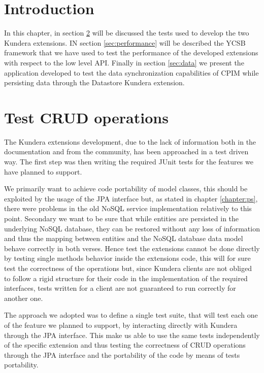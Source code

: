 \section{Introduction}
In this chapter, in section \ref{sec:crud} will be discussed the tests used to develop the two Kundera extensions.
IN section \ref{sec:performance} will be described the YCSB framework that we have used to test the performance of the developed extensions with respect to the low level API.
Finally in section \ref{sec:data} we present the application developed to test the data synchronization capabilities of CPIM while persisting data through the Datastore Kundera extension. 

\section{Test CRUD operations}
\label{sec:crud}
The Kundera extensions development, due to the lack of information both in the documentation and from the community, has been approached in a test driven way.
The first step was then writing the required JUnit tests for the features we have planned to support.

\newparagraph We primarily want to achieve code portability of model classes, this should be exploited by the usage of the JPA interface but, as stated in chapter \ref{chapter:ps}, there were problems in the old NoSQL service implementation relatively to this point.
Secondary we want to be sure that while entities are persisted in the underlying NoSQL database, they can be restored without any loss of information and thus the mapping between entities and the NoSQL database data model behave correctly in both verses.
Hence test the extensions cannot be done directly by testing single methods behavior inside the extensions code, this will for sure test the correctness of the operations but, since Kundera clients are not obliged to follow a rigid structure for their code in the implementation of the required interfaces, tests written for a client are not guaranteed to run correctly for another one. 

\noindent The approach we adopted was to define a single test suite, that will test each one of the feature we planned to support, by interacting directly with Kundera through the JPA interface. This make us able to use the same tests independently of the specific extension and thus testing the correctness of CRUD operations through the JPA interface and the portability of the code by means of tests portability.

